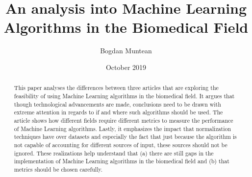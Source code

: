 \documentclass[fullpage]{article}
\title{An analysis into Machine Learning Algorithms in the Biomedical Field}
\author{Bogdan Muntean}
\date{October 2019}
\begin{document}
\maketitle

\begin{abstract}
This paper analyses the differences between three articles that are exploring the feasibility of using Machine Learning algorithms in the biomedical field. It argues that though technological advancements are made, conclusions need to be drawn with extreme attention in regards to if and where such algorithms should be used. The article shows how different fields require different metrics to measure the performance of Machine Learning algorithms. 
Lastly, it emphasizes the impact that normalization techniques have over datasets and especially the fact that just because the algorithm is not capable of accounting for different sources of input, these sources should not be ignored. These realizations help understand that (a) there are still gaps in the implementation of Machine Learning algorithms in the biomedical field and (b) that metrics should be chosen carefully.
\end{abstract}
\end{document}
